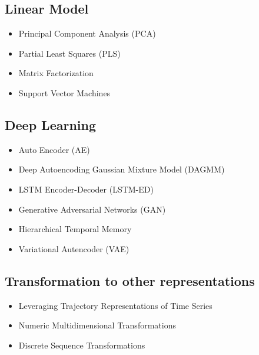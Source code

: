 \subsection{Linear Model}

\begin{itemize}
    \item Principal Component Analysis (PCA) %
    \item Partial Least Squares (PLS) %
    \item Matrix Factorization %
    \item Support Vector Machines %
\end{itemize}

\subsection{Deep Learning}

\begin{itemize}
    \item Auto Encoder (AE) %
    \item Deep Autoencoding Gaussian Mixture Model (DAGMM) %
    \item LSTM Encoder-Decoder (LSTM-ED) %
    \item Generative Adversarial Networks (GAN) %
    \item Hierarchical Temporal Memory
\item Variational Autencoder (VAE)
\end{itemize}

\subsection{Transformation to other representations}

\begin{itemize}
    \item Leveraging Trajectory Representations of Time Series %
    \item Numeric Multidimensional Transformations %
    \item Discrete Sequence Transformations %
\end{itemize}

\newpage




